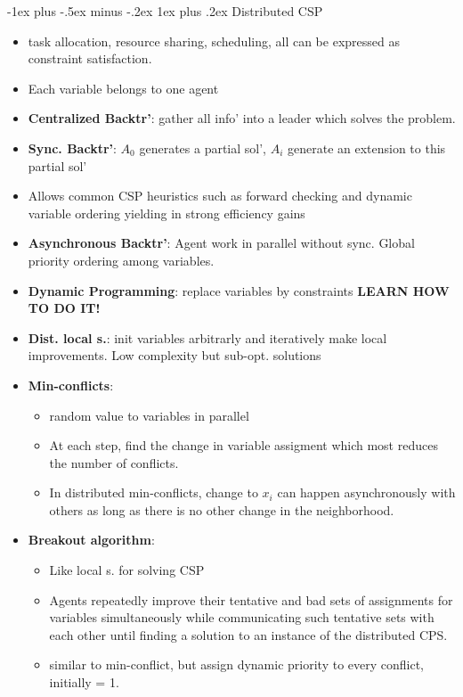 \documentclass[10pt,a4paper,landscape]{article}
\makeatletter
\renewcommand{\subsubsection}{\@startsection{subsubsection}{3}{0mm}%
                                {-1ex plus -.5ex minus -.2ex}%
                                {1ex plus .2ex}%
                                {\normalfont\small\bfseries}}
\makeatother
\begin{document}
\begin{multicols*}{2}
\subsubsection{Distributed CSP}
\begin{itemize}
 	\item  task allocation, resource sharing, scheduling, all can be expressed as constraint satisfaction. 
 	\item Each variable belongs to one agent
 	\item \textbf{Centralized Backtr'}: gather all info' into a leader which solves the problem.
 	\item \textbf{Sync. Backtr'}: $A_0$ generates a partial sol',
	$A_i$ generate an extension to this partial sol'
 	\item Allows common CSP heuristics such as forward checking and dynamic variable ordering yielding in strong efficiency gains
 	\item \textbf{Asynchronous Backtr'}: Agent work in parallel without sync. Global priority ordering among variables.
 	\item \textbf{Dynamic Programming}: replace variables by constraints \textbf{LEARN HOW TO DO IT!}

 	\item \textbf{Dist. local s.}: init variables arbitrarly and iteratively make local improvements. Low complexity but sub-opt. solutions

 	\item \textbf{Min-conflicts}: 
 	\begin{itemize}
 		\item random value to variables in parallel 
 		\item At each step, find the change in variable assigment which most reduces the number of conflicts.
 		\item In distributed min-conflicts, change to $x_i$ can happen asynchronously with others as long as there is no other change in the neighborhood. %
 	\end{itemize}
 	\item \textbf{Breakout algorithm}:
 	\begin{itemize}
 		\item Like local s. for solving CSP
 		\item Agents repeatedly improve their tentative and bad sets of assignments for variables simultaneously while communicating such tentative sets with each other until finding a solution to an instance of the distributed CPS.
 	 	\item similar to min-conflict, but assign dynamic priority to every conflict, initially = 1.
 	 \end{itemize}	
 \end{itemize}


\end{multicols*}
\end{document}
